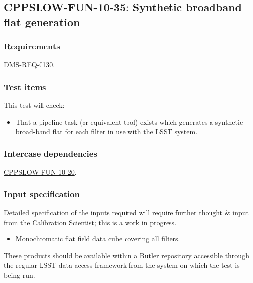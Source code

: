 \subsection{CPPSLOW-FUN-10-35: Synthetic broadband flat generation}
\label{cppslow-fun-10-35}

\subsubsection{Requirements}

DMS-REQ-0130.

\subsubsection{Test items}

This test will check:

\begin{itemize}

  \item{That a pipeline task (or equivalent tool) exists which generates a
  synthetic broad-band flat for each filter in use with the LSST system.}

\end{itemize}

\subsubsection{Intercase dependencies}

\hyperref[cppslow-fun-10-20]{CPPSLOW-FUN-10-20}.

\subsubsection{Input specification}

\begin{note}
Detailed specification of the inputs required will require further thought \&
input from the Calibration Scientist; this is a work in progress.
\end{note}

\begin{itemize}

  \item{Monochromatic flat field data cube covering all filters.}

\end{itemize}

These products should be available within a Butler repository accessible
through the regular LSST data access framework from the system on which the test
is being run.

